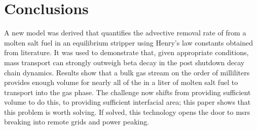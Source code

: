 \section{Conclusions} \label{sec-sum}
A new model was derived that quantifies the advective removal rate of \Xe from a molten salt fuel in an equilibrium stripper using Henry's law constants obtained from literature. It was used to demonstrate that, given appropriate conditions, mass transport can strongly outweigh beta decay in the post shutdown \Xe decay chain dynamics. Results show that a bulk gas stream on the order of milliliters provides enough volume for nearly all of the \Xe in a liter of molten salt fuel to transport into the gas phase. The challenge now shifts from providing sufficient volume to do this, to providing sufficient interfacial area; this paper shows that this problem is worth solving. If solved, this technology opens the door to \acsp{msr} breaking into remote grids and power peaking.


